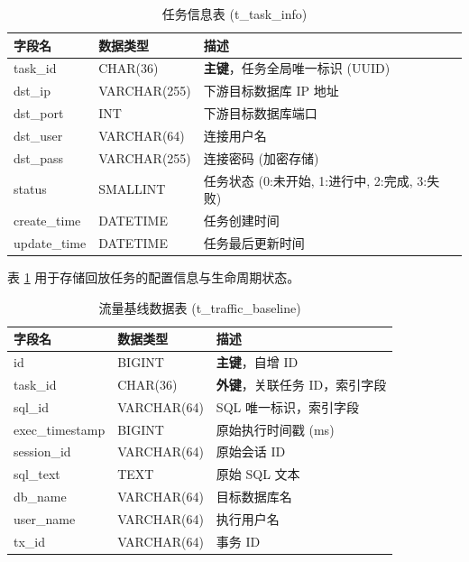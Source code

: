 \begin{table}[htbp]
    \centering
    \caption{任务信息表 (t\_task\_info)}
    \label{tab:task_info}
    \begin{tabular}{l l p{6cm}}
        \toprule
        \textbf{字段名} & \textbf{数据类型} & \textbf{描述} \\
        \midrule
        task\_id & CHAR(36) & \textbf{主键}，任务全局唯一标识 (UUID) \\
        dst\_ip & VARCHAR(255) & 下游目标数据库 IP 地址 \\
        dst\_port & INT & 下游目标数据库端口 \\
        dst\_user & VARCHAR(64) & 连接用户名 \\
        dst\_pass & VARCHAR(255) & 连接密码 (加密存储) \\
        status & SMALLINT & 任务状态 (0:未开始, 1:进行中, 2:完成, 3:失败) \\
        create\_time & DATETIME & 任务创建时间 \\
        update\_time & DATETIME & 任务最后更新时间 \\
        \bottomrule
    \end{tabular}
\end{table}

表 \ref{tab:task_info} 用于存储回放任务的配置信息与生命周期状态。

\begin{table}[htbp]
    \centering
    \caption{流量基线数据表 (t\_traffic\_baseline)}
    \label{tab:traffic_baseline}
    \begin{tabular}{l l p{6cm}}
        \toprule
        \textbf{字段名} & \textbf{数据类型} & \textbf{描述} \\
        \midrule
        id & BIGINT & \textbf{主键}，自增 ID \\
        task\_id & CHAR(36) & \textbf{外键}，关联任务 ID，索引字段 \\
        sql\_id & VARCHAR(64) & SQL 唯一标识，索引字段 \\
        exec\_timestamp & BIGINT & 原始执行时间戳 (ms) \\
        session\_id & VARCHAR(64) & 原始会话 ID \\
        sql\_text & TEXT & 原始 SQL 文本 \\
        db\_name & VARCHAR(64) & 目标数据库名 \\
        user\_name & VARCHAR(64) & 执行用户名 \\
        tx\_id & VARCHAR(64) & 事务 ID \\
        \bottomrule
    \end{tabular}
\end{table}

